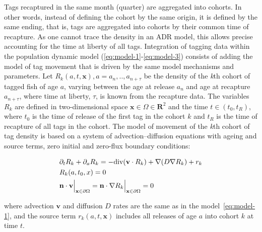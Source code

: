 Tags recaptured in the same month (quarter) are aggregated into cohorts. In other words, instead of defining the cohort by the same origin, it is defined by the same ending, that is, tags are aggregated into cohorts by their common time of recapture. As one cannot trace the density in an ADR model, this allows precise accounting for the time at liberty of all tags. Integration of tagging data within the population dynamic model (\ref{eq:model-1}-\ref{eq:model-3}) consists of adding the model of tag movement that is driven by the same model mechanisms and parameters. Let $R_k(a,t,\mathbf{x}), a=a_n,..,a_{n+\tau}$ be the density of the \textit{k}th cohort of tagged fish of age $a$, varying between the age at release $a_n$ and age at recapture $a_{n+\tau}$, where time at liberty,
$\tau$, is known from the recapture data. The variables $R_k$ are defined in two-dimensional space $\mathbf{x} \in \Omega \in \mathbf{R}^2$ and the time $t
\in (t_0,t_{R})$, where $t_0$ is the time of release of the first tag
in the cohort $k$ and $t_R$ is the time of recapture of all tags in
the cohort. The model of movement of the \textit{k}th cohort of tag density is based on a system
of advection--diffusion equations with ageing and source terms, zero initial and zero-flux boundary conditions:
\begin{linenomath}
\begin{align}{\label{eq:tagmodel}}
& \partial_t R_k+\partial_a R_k =-\text{div} (\mathbf v \cdot R_k ) +\nabla (D \nabla R_k) + r_k \\
& R_k(a,t_0,x)  = 0 \nonumber \\
& \mathbf n \cdot \mathbf v \Bigr\rvert_{\mathbf x \in \partial \Omega} = \mathbf n \cdot\nabla R_k \Bigr\rvert_{\mathbf x \in \partial \Omega} = 0 \nonumber
\end{align}
\end{linenomath}
where advection $\mathbf{v}$ and diffusion $D$ rates are the same as in the model~\ref{eq:model-1}, and the source term $r_k(a,t,\mathbf{x})$ includes all releases of age $a$ into cohort $k$ at time $t$. 

